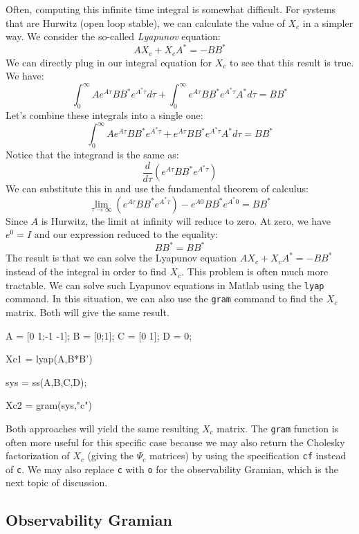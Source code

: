 Often, computing this infinite time integral is somewhat difficult. For systems that are Hurwitz (open loop stable), we can calculate the value of $X_c$ in a simpler way. We consider the so-called \textit{Lyapunov} equation:
$$AX_c+X_cA^*=-BB^*$$
We can directly plug in our integral equation for $X_c$ to see that this result is true. We have:
$$\int_0^\infty Ae^{A\tau}BB^*e^{A^*\tau}d\tau+\int_0^\infty e^{A\tau}BB^*e^{A^*\tau}A^*d\tau =BB^*$$
Let's combine these integrals into a single one:
$$\int_0^\infty Ae^{A\tau}BB^*e^{A^*\tau}+e^{A\tau}BB^*e^{A^*\tau}A^*d\tau =BB^*$$
Notice that the integrand is the same as:
$$\frac{d}{d\tau}\left(e^{A\tau }BB^*e^{A^*\tau}\right)$$
We can substitute this in and use the fundamental theorem of calculus:
$$\lim_{\tau\rightarrow\infty} \left(e^{A\tau }BB^*e^{A^*\tau}\right)-e^{A0 }BB^*e^{A^*0}=BB^*$$
Since $A$ is Hurwitz, the limit at infinity will reduce to zero. At zero, we have $e^0=I$ and our expression reduced to the equality:
$$BB^*=BB^*$$
The result is that we can solve the Lyapunov equation $AX_c+X_cA^*=-BB^*$ instead of the integral in order to find $X_c$. This problem is often much more tractable. We can solve such Lyapunov equations in Matlab using the \texttt{lyap} command. In this situation, we can also use the \texttt{gram} command to find the $X_c$ matrix. Both will give the same result.
\begin{matlabscript}{}
A = [0 1;-1 -1];
B = [0;1];
C = [0 1];
D = 0;

Xc1 = lyap(A,B*B')

sys = ss(A,B,C,D);

Xc2 = gram(sys,"c")
\end{matlabscript}
Both approaches will yield the same resulting $X_c$ matrix. The \texttt{gram} function is often more useful for this specific case because we may also return the Cholesky factorization of $X_c$ (giving the $\Psi_c$ matrices) by using the specification \texttt{cf} instead of \texttt{c}. We may also replace \texttt{c} with \texttt{o} for the observability Gramian, which is the next topic of discussion.

\subsection{Observability Gramian}

